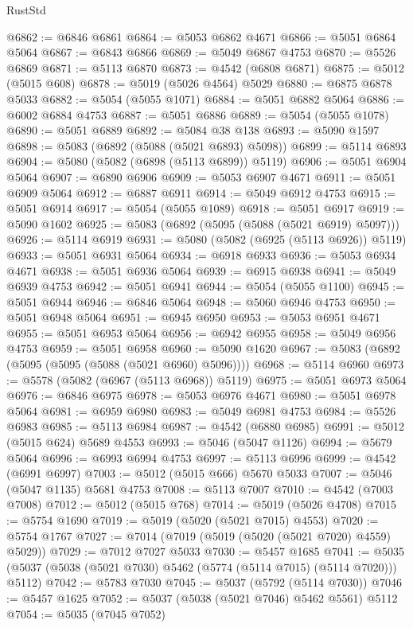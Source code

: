 \begin{lexlean}{RustStd}
\begin{coremodule}
@6862 := @6846 @6861
@6864 := @5053 @6862 @4671
@6866 := @5051 @6864 @5064
@6867 := @6843 @6866
@6869 := @5049 @6867 @4753
@6870 := @5526 @6869
@6871 := @5113 @6870
@6873 := @4542 (@6808 @6871)
@6875 := @5012 (@5015 @608)
@6878 := @5019 (@5026 @4564) @5029
@6880 := @6875 @6878 @5033
@6882 := @5054 (@5055 @1071)
@6884 := @5051 @6882 @5064
@6886 := @6002 @6884 @4753
@6887 := @5051 @6886
@6889 := @5054 (@5055 @1078)
@6890 := @5051 @6889
@6892 := @5084 @38 @138
@6893 := @5090 @1597
@6898 := @5083 (@6892 (@5088 (@5021 @6893) @5098))
@6899 := @5114 @6893
@6904 := @5080 (@5082 (@6898 (@5113 @6899)) @5119)
@6906 := @5051 @6904 @5064
@6907 := @6890 @6906
@6909 := @5053 @6907 @4671
@6911 := @5051 @6909 @5064
@6912 := @6887 @6911
@6914 := @5049 @6912 @4753
@6915 := @5051 @6914
@6917 := @5054 (@5055 @1089)
@6918 := @5051 @6917
@6919 := @5090 @1602
@6925 := @5083 (@6892 (@5095 (@5088 (@5021 @6919) @5097)))
@6926 := @5114 @6919
@6931 := @5080 (@5082 (@6925 (@5113 @6926)) @5119)
@6933 := @5051 @6931 @5064
@6934 := @6918 @6933
@6936 := @5053 @6934 @4671
@6938 := @5051 @6936 @5064
@6939 := @6915 @6938
@6941 := @5049 @6939 @4753
@6942 := @5051 @6941
@6944 := @5054 (@5055 @1100)
@6945 := @5051 @6944
@6946 := @6846 @5064
@6948 := @5060 @6946 @4753
@6950 := @5051 @6948 @5064
@6951 := @6945 @6950
@6953 := @5053 @6951 @4671
@6955 := @5051 @6953 @5064
@6956 := @6942 @6955
@6958 := @5049 @6956 @4753
@6959 := @5051 @6958
@6960 := @5090 @1620
@6967 := @5083 (@6892 (@5095 (@5095 (@5088 (@5021 @6960) @5096))))
@6968 := @5114 @6960
@6973 := @5578 (@5082 (@6967 (@5113 @6968)) @5119)
@6975 := @5051 @6973 @5064
@6976 := @6846 @6975
@6978 := @5053 @6976 @4671
@6980 := @5051 @6978 @5064
@6981 := @6959 @6980
@6983 := @5049 @6981 @4753
@6984 := @5526 @6983
@6985 := @5113 @6984
@6987 := @4542 (@6880 @6985)
@6991 := @5012 (@5015 @624) @5689 @4553
@6993 := @5046 (@5047 @1126)
@6994 := @5679 @5064
@6996 := @6993 @6994 @4753
@6997 := @5113 @6996
@6999 := @4542 (@6991 @6997)
@7003 := @5012 (@5015 @666) @5670 @5033
@7007 := @5046 (@5047 @1135) @5681 @4753
@7008 := @5113 @7007
@7010 := @4542 (@7003 @7008)
@7012 := @5012 (@5015 @768)
@7014 := @5019 (@5026 @4708)
@7015 := @5754 @1690
@7019 := @5019 (@5020 (@5021 @7015) @4553)
@7020 := @5754 @1767
@7027 := @7014 (@7019 (@5019 (@5020 (@5021 @7020) @4559) @5029))
@7029 := @7012 @7027 @5033
@7030 := @5457 @1685
@7041 := @5035 (@5037 (@5038 (@5021 @7030) @5462 (@5774 (@5114 @7015) (@5114 @7020))) @5112)
@7042 := @5783 @7030
@7045 := @5037 (@5792 (@5114 @7030))
@7046 := @5457 @1625
@7052 := @5037 (@5038 (@5021 @7046) @5462 @5561) @5112
@7054 := @5035 (@7045 @7052)

\end{coremodule}
\end{lexlean}
